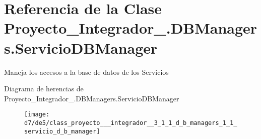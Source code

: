 \hypertarget{class_proyecto___integrador__3_1_1_d_b_managers_1_1_servicio_d_b_manager}{\section{Referencia de la Clase Proyecto\-\_\-\-Integrador\-\_.\-D\-B\-Managers.\-Servicio\-D\-B\-Manager}
\label{class_proyecto___integrador__3_1_1_d_b_managers_1_1_servicio_d_b_manager}
}


Maneja los accesos a la base de datos de los Servicios  


Diagrama de herencias de Proyecto\-\_\-\-Integrador\-\_.\-D\-B\-Managers.\-Servicio\-D\-B\-Manager\begin{figure}[H]
\begin{center}
\leavevmode
\texttt{[image: d7/de5/class\_proyecto\_\_\_integrador\_\_3\_1\_1\_d\_b\_managers\_1\_1\_servicio\_d\_b\_manager]}
\end{center}
\end{figure}
